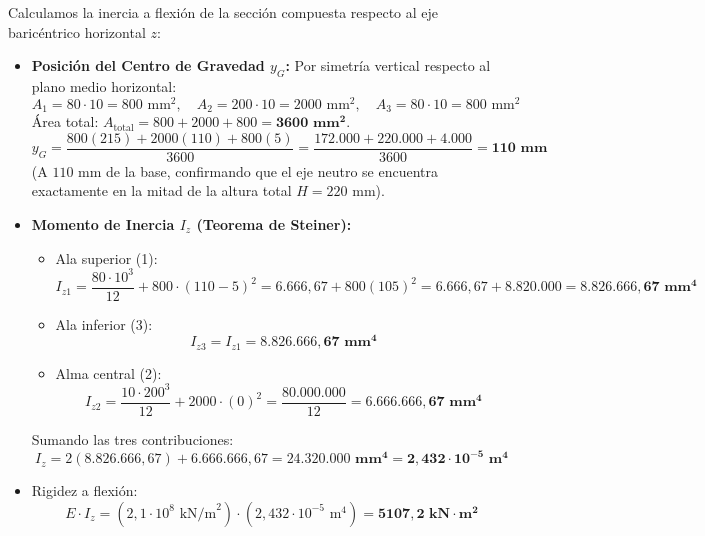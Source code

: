 
Calculamos la inercia a flexión de la sección compuesta respecto al eje baricéntrico horizontal $z$:
\begin{itemize}
    \item \textbf{Posición del Centro de Gravedad $y_G$:}
          Por simetría vertical respecto al plano medio horizontal:
          \begin{equation}
              A_1 = 80 \cdot 10 = 800\text{ mm}^2, \quad A_2 = 200 \cdot 10 = 2000\text{ mm}^2, \quad A_3 = 80 \cdot 10 = 800\text{ mm}^2
          \end{equation}
          Área total: $A_{\text{total}} = 800 + 2000 + 800 = \mathbf{3600\text{ mm}^2}$.
          \begin{equation}
              y_G = \frac{800(215) + 2000(110) + 800(5)}{3600} = \frac{172.000 + 220.000 + 4.000}{3600} = \mathbf{110\text{ mm}}
          \end{equation}
          (A $110\text{ mm}$ de la base, confirmando que el eje neutro se encuentra exactamente en la mitad de la altura total $H = 220\text{ mm}$).

    \item \textbf{Momento de Inercia $I_z$ (Teorema de Steiner):}
          \begin{itemize}
              \item Ala superior (1):
                    \[
                        I_{z1} = \frac{80 \cdot 10^3}{12} + 800 \cdot (110 - 5)^2 = 6.666{,}67 + 800(105)^2 = 6.666{,}67 + 8.820.000 = \mathbf{8.826.666{,}67\text{ mm}^4}
                    \]
              \item Ala inferior (3):
                    \[
                        I_{z3} = I_{z1} = \mathbf{8.826.666{,}67\text{ mm}^4}
                    \]
              \item Alma central (2):
                    \[
                        I_{z2} = \frac{10 \cdot 200^3}{12} + 2000 \cdot (0)^2 = \frac{80.000.000}{12} = \mathbf{6.666.666{,}67\text{ mm}^4}
                    \]
          \end{itemize}
          Sumando las tres contribuciones:
          \begin{equation}
              \boxed{I_z = 2(8.826.666{,}67) + 6.666.666{,}67 = \mathbf{24.320.000\text{ mm}^4 = 2{,}432 \cdot 10^{-5}\text{ m}^4}}
          \end{equation}
    \item Rigidez a flexión:
          \begin{equation}
              E \cdot I_z = (2{,}1 \cdot 10^8\text{ kN/m}^2) \cdot (2{,}432 \cdot 10^{-5}\text{ m}^4) = \mathbf{5107{,}2\text{ kN}\cdot\text{m}^2}
          \end{equation}
\end{itemize}

